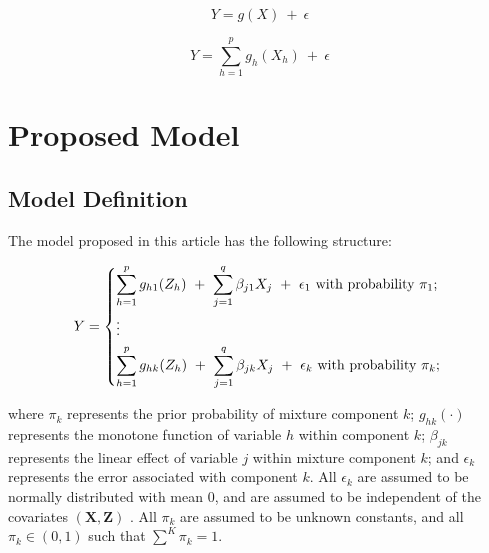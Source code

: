 \documentclass[10pt]{olplainarticle}\usepackage[]{graphicx}\usepackage[]{color}
\begin{document}
\begin{equation} \label{pava}
  Y = g(X) \ +\ \epsilon
\end{equation}


\begin{equation} \label{cpav}
  Y = \sum_{h=1}^{p} g_{h} (X_{h}) \ +\ \epsilon
\end{equation}


% 

\section{Proposed Model}


\subsection{Model Definition}

The model proposed in this article has the following structure:

\begin{equation} \label{modstruc}
  Y = 
  \begin{dcases}
    \sum_{h=1}^{p} g_{h1} (Z_{h}) \ +\  \sum_{j=1}^{q} \beta_{j1} X_{j} \ +\ \epsilon_1 \text{  with probability $\pi_1$; } \\
    \vdots \\
    \sum_{h=1}^{p} g_{hk} (Z_{h}) \ +\  \sum_{j=1}^{q} \beta_{jk} X_{j} \ +\ \epsilon_k \text{  with probability $\pi_k$; }\\
  \end{dcases}
\end{equation}

where $\pi_k$ represents the prior probability of mixture component $k$; $g_{hk}(\cdot)$ represents the monotone function of variable $h$ within component $k$; $\beta_{jk}$ represents the linear effect of variable $j$ within mixture component $k$; and $\epsilon_k$ represents the error associated with component $k$. All $\epsilon_k$ are assumed to be normally distributed with mean $0$, and are assumed to be independent of the covariates $(\boldsymbol{X}, \boldsymbol{Z})$ . All $\pi_k$ are assumed to be unknown constants, and all $\pi_k \in (0,1)$ such that $\sum^{K} \pi_k = 1$.
\end{document}
